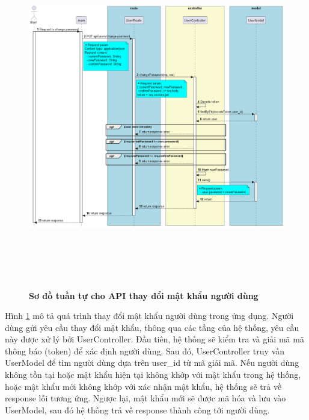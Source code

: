 \begin{figure}[H]
  \centering
  \includegraphics[width=14cm,height=15cm]{Images/server/sequence/server/changePassword.png}
  \caption[Sơ đồ tuần tự cho API thay đổi mật khẩu người dùng ]{\bfseries \fontsize{12pt}{0pt}
  \selectfont Sơ đồ tuần tự cho API thay đổi mật khẩu người dùng }
  \label{changePassword} %
\end{figure}

Hình \ref{changePassword} mô tả quá trình thay đổi mật khẩu người dùng trong ứng dụng. Người dùng gửi yêu cầu thay đổi mật khẩu, thông qua các tầng của hệ thống, yêu cầu này được xử lý bởi UserController. Đầu tiên, hệ thống sẽ kiểm tra và giải mã mã thông báo (token) để xác định người dùng. Sau đó, UserController truy vấn UserModel để tìm người dùng dựa trên user\_id từ mã giải mã. Nếu người dùng không tồn tại hoặc mật khẩu hiện tại không khớp với mật khẩu trong hệ thống, hoặc mật khẩu mới không khớp với xác nhận mật khẩu, hệ thống sẽ trả về response lỗi tương ứng. Ngược lại, mật khẩu mới sẽ được mã hóa và lưu vào UserModel, sau đó hệ thống trả về response thành công tới người dùng.



